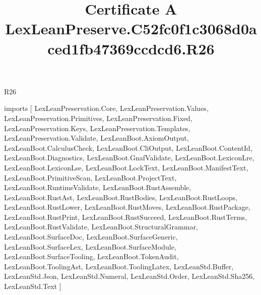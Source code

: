 \begin{lexlean}{R26}
\title{Certificate A LexLeanPreserve.C52fc0f1c3068d0aced1fb47369ccdcd6.R26}
\begin{coremodule}
imports [
  LexLeanPreservation.Core,
  LexLeanPreservation.Values,
  LexLeanPreservation.Primitives,
  LexLeanPreservation.Fixed,
  LexLeanPreservation.Keys,
  LexLeanPreservation.Templates,
  LexLeanPreservation.Validate,
  LexLeanBoot.AxiomOutput,
  LexLeanBoot.CalculusCheck,
  LexLeanBoot.CliOutput,
  LexLeanBoot.ContentId,
  LexLeanBoot.Diagnostics,
  LexLeanBoot.GnafValidate,
  LexLeanBoot.LexiconLre,
  LexLeanBoot.LexiconLse,
  LexLeanBoot.LockText,
  LexLeanBoot.ManifestText,
  LexLeanBoot.PrimitiveScan,
  LexLeanBoot.ProjectText,
  LexLeanBoot.RuntimeValidate,
  LexLeanBoot.RustAssemble,
  LexLeanBoot.RustAst,
  LexLeanBoot.RustBodies,
  LexLeanBoot.RustLoops,
  LexLeanBoot.RustLower,
  LexLeanBoot.RustMoves,
  LexLeanBoot.RustPackage,
  LexLeanBoot.RustPrint,
  LexLeanBoot.RustSucceed,
  LexLeanBoot.RustTerms,
  LexLeanBoot.RustValidate,
  LexLeanBoot.StructuralGrammar,
  LexLeanBoot.SurfaceDoc,
  LexLeanBoot.SurfaceGeneric,
  LexLeanBoot.SurfaceLex,
  LexLeanBoot.SurfaceModule,
  LexLeanBoot.SurfaceTooling,
  LexLeanBoot.TokenAudit,
  LexLeanBoot.ToolingAst,
  LexLeanBoot.ToolingLatex,
  LexLeanStd.Buffer,
  LexLeanStd.Json,
  LexLeanStd.Numeral,
  LexLeanStd.Order,
  LexLeanStd.Sha256,
  LexLeanStd.Text
]


\end{coremodule}
\end{lexlean}
